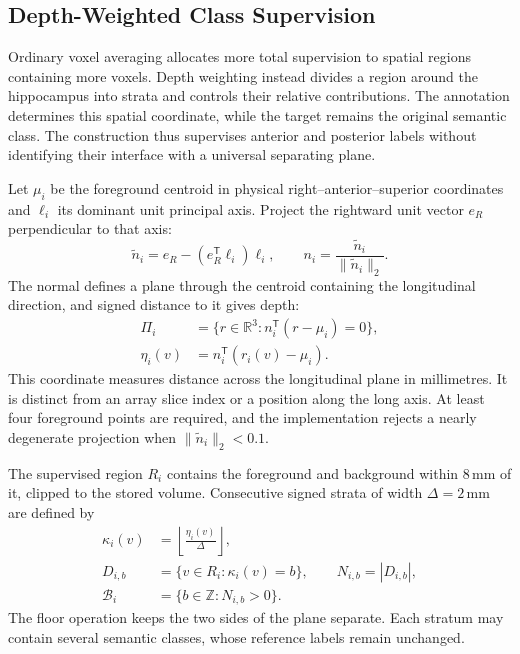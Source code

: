 \documentclass[12pt,a4paper]{article}
\begin{document}
\subsection{Depth-Weighted Class Supervision}\label{sec:depth-constraints}

Ordinary voxel averaging allocates more total supervision to spatial
regions containing more voxels. Depth weighting instead divides a
region around the hippocampus into strata and controls their relative
contributions. The annotation determines this spatial coordinate, while
the target remains the original semantic class. The construction thus
supervises anterior and posterior labels without identifying their
interface with a universal separating plane.

Let $\mu_i$ be the foreground centroid in physical
right--anterior--superior coordinates and $\ell_i$ its dominant unit
principal axis. Project the rightward unit vector $e_R$ perpendicular
to that axis:
\begin{equation}
\widetilde n_i=e_R-(e_R^{\mathsf T}\ell_i)\ell_i,
\qquad
n_i=\frac{\widetilde n_i}{\|\widetilde n_i\|_2}.
\label{eq:depth-plane-normal}
\end{equation}
The normal defines a plane through the centroid containing the
longitudinal direction, and signed distance to it gives depth:
\begin{equation}
\begin{aligned}
\Pi_i&=\{r\in\mathbb{R}^{3}:n_i^{\mathsf T}(r-\mu_i)=0\},\\
\eta_i(v)&=n_i^{\mathsf T}(r_i(v)-\mu_i).
\end{aligned}
\label{eq:depth-plane-coordinate}
\end{equation}
This coordinate measures distance across the longitudinal plane in
millimetres. It is distinct from an array slice index or a position
along the long axis. At least four foreground points are required,
and the implementation rejects a nearly degenerate projection when
$\|\widetilde n_i\|_2<0.1$.

The supervised region $R_i$ contains the foreground and background
within $8\,\mathrm{mm}$ of it, clipped to the stored volume. Consecutive
signed strata of width $\Delta=2\,\mathrm{mm}$ are defined by
\begin{equation}
\begin{aligned}
\kappa_i(v)&=\left\lfloor\frac{\eta_i(v)}{\Delta}\right\rfloor,\\
D_{i,b}&=\{v\in R_i:\kappa_i(v)=b\},
\qquad N_{i,b}=|D_{i,b}|,\\
\mathcal{B}_i&=\{b\in\mathbb{Z}:N_{i,b}>0\}.
\end{aligned}
\label{eq:depth-strata}
\end{equation}
The floor operation keeps the two sides of the plane separate.
Each stratum may contain several semantic classes, whose reference
labels remain unchanged.
\end{document}
